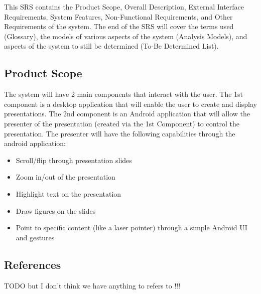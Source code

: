 \documentclass{article}
\begin{document}
This SRS contains the Product Scope, Overall Description, External Interface Requirements, System Features, Non-Functional Requirements, and Other Requirements of the system. 
The end of the SRS will cover the terms used (Glossary), the models of various aspects of the system (Analysis Models), and aspects of the system to still be determined (To-Be Determined List).

\subsection{Product Scope}
The system will have 2 main components that interact with the user. 
The 1st component is a desktop application that will enable the user to create and display presentations. 
The 2nd component is an Android application that will allow the presenter of the presentation (created via the 1st Component) to control the presentation. 
The presenter will have the following capabilities through the android application:
\begin{itemize}
\item Scroll/flip through presentation slides
\item Zoom in/out of the presentation
\item Highlight text on the presentation
\item Draw figures on the slides
\item Point to specific content (like a laser pointer) through a simple Android UI and gestures
\end{itemize}


\subsection{References}

TODO but I don't think we have anything to refers to !!!
\end{document}
